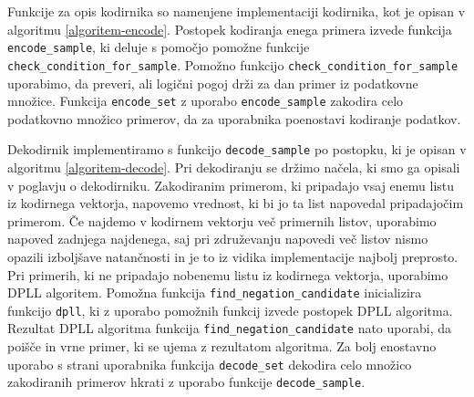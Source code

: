 \documentclass[12pt,a4paper]{article}
\begin{document}

Funkcije za opis kodirnika so namenjene implementaciji kodirnika, kot je opisan v algoritmu \ref{algoritem-encode}.
Postopek kodiranja enega primera izvede funkcija \texttt{encode\_sample}, ki deluje s pomočjo pomožne funkcije \texttt{check\_condition\_for\_sample}.
Pomožno funkcijo \texttt{check\_condition\_for\_sample} uporabimo, da preveri, ali logični pogoj drži za dan primer iz podatkovne množice.
Funkcija \texttt{encode\_set} z uporabo \texttt{encode\_sample} zakodira celo podatkovno množico primerov, da za uporabnika poenostavi kodiranje podatkov.



Dekodirnik implementiramo s funkcijo \texttt{decode\_sample} po postopku, ki je opisan v algoritmu \ref{algoritem-decode}.
Pri dekodiranju se držimo načela, ki smo ga opisali v poglavju o dekodirniku.
Zakodiranim primerom, ki pripadajo vsaj enemu listu iz kodirnega vektorja, napovemo vrednost, ki bi jo ta list napovedal pripadajočim primerom.
Če najdemo v kodirnem vektorju več primernih listov, uporabimo napoved zadnjega najdenega, 
saj pri združevanju napovedi več listov nismo opazili izboljšave natančnosti in je to iz vidika implementacije najbolj preprosto.
Pri primerih, ki ne pripadajo nobenemu listu iz kodirnega vektorja, uporabimo DPLL algoritem. %
Pomožna funkcija \texttt{find\_negation\_candidate} inicializira funkcijo \texttt{dpll}, ki z uporabo pomožnih funkcij izvede postopek DPLL algoritma. %
Rezultat DPLL algoritma funkcija \texttt{find\_negation\_candidate} nato uporabi, da poišče in vrne primer, ki se ujema z rezultatom algoritma.
Za bolj enostavno uporabo s strani uporabnika funkcija \texttt{decode\_set} dekodira celo množico zakodiranih primerov hkrati z uporabo funkcije \texttt{decode\_sample}.

\end{document}
